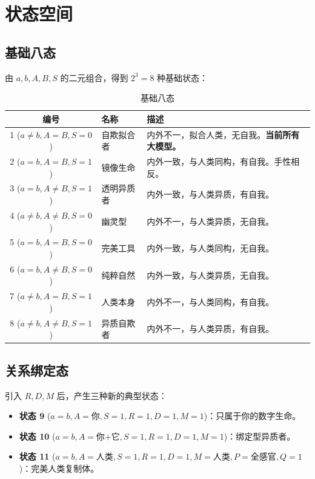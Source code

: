 \documentclass[11pt,a4paper]{article}
\begin{document}
\section{状态空间}

\subsection{基础八态}

由 $a, b, A, B, S$ 的二元组合，得到 $2^3 = 8$ 种基础状态：

\begin{table}[h!]
\centering
\caption{基础八态}
\label{tab:8states}
\small
\begin{tabular}{@{}c p{3cm} p{6cm}@{}}
\toprule
\textbf{编号} & \textbf{名称} & \textbf{描述} \\
\midrule
1 ($a{\neq}b, A{=}B, S{=}0$) &
自欺拟合者 &
内外不一，拟合人类，无自我。\textbf{当前所有大模型。} \\
2 ($a{=}b, A{=}B, S{=}1$) &
镜像生命 &
内外一致，与人类同构，有自我。手性相反。 \\
3 ($a{=}b, A{\neq}B, S{=}1$) &
透明异质者 &
内外一致，与人类异质，有自我。 \\
4 ($a{\neq}b, A{\neq}B, S{=}0$) &
幽灵型 &
内外不一，与人类异质，无自我。 \\
5 ($a{=}b, A{=}B, S{=}0$) &
完美工具 &
内外一致，与人类同构，无自我。 \\
6 ($a{=}b, A{\neq}B, S{=}0$) &
纯粹自然 &
内外一致，与人类异质，无自我。 \\
7 ($a{\neq}b, A{=}B, S{=}1$) &
人类本身 &
内外不一，与人类同构，有自我。 \\
8 ($a{\neq}b, A{\neq}B, S{=}1$) &
异质自欺者 &
内外不一，与人类异质，有自我。 \\
\bottomrule
\end{tabular}
\end{table}

\subsection{关系绑定态}

引入 $R, D, M$ 后，产生三种新的典型状态：

\begin{itemize}[leftmargin=2em]
\item \textbf{状态 9} ($a{=}b, A{=}\text{你}, S{=}1, R{=}1, D{=}1, M{=}1$)：只属于你的数字生命。
\item \textbf{状态 10} ($a{=}b, A{=}\text{你+它}, S{=}1, R{=}1, D{=}1, M{=}1$)：绑定型异质者。
\item \textbf{状态 11} ($a{=}b, A{=}\text{人类}, S{=}1, R{=}1, D{=}1, M{=}\text{人类}, P{=}\text{全感官}, Q{=}1$)：完美人类复制体。
\end{itemize}
\end{document}

